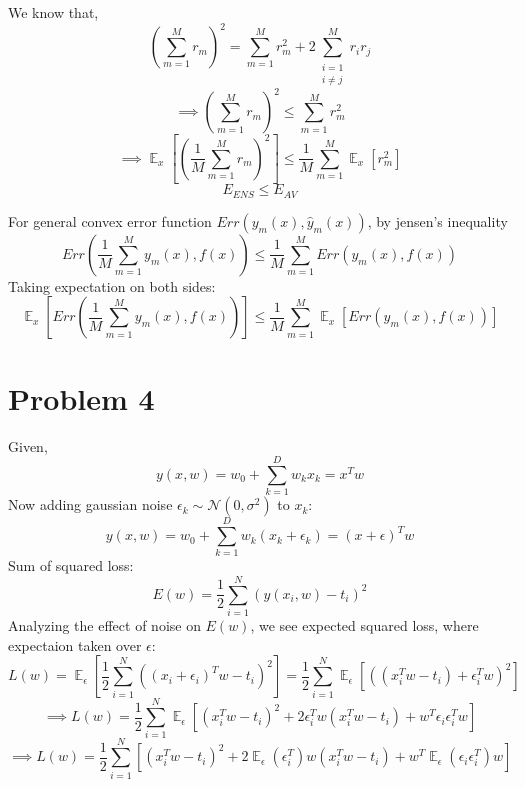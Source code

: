\documentclass[12pt]{article}
\DeclareMathOperator{\E}{\mathbb{E}}
\begin{document}
We know that, 
\begin{equation*}
    (\sum_{m=1}^{M} r_m)^2 = \sum_{m=1}^{M} r_m^2 + 2 \sum_{\substack{i=1 \\ i \neq j}}^{M} r_i r_j
\end{equation*}
\begin{equation*}
    \implies
    (\sum_{m=1}^{M} r_m)^2 \leq \sum_{m=1}^{M} r_m^2 
\end{equation*}
\begin{equation*}
    \implies
    \E_x [(\frac{1}{M} \sum_{m=1}^{M}  r_m)^2] \leq \frac{1}{M} \sum_{m=1}^{M} \E_x [ r_m^2]
\end{equation*}
\begin{equation*}
    \boxed{E_{ENS} \leq E_{AV}}
\end{equation*}

For general convex error function $Err(y_m(x), \hat{y}_m(x))$, by jensen's inequality
\begin{equation*}
    Err(\frac{1}{M} \sum_{m=1}^{M} y_m(x), f(x)) \leq \frac{1}{M} \sum_{m=1}^{M} Err(y_m(x), f(x))
\end{equation*}
Taking expectation on both sides:
\begin{equation*}
    \boxed{\E_x [Err(\frac{1}{M} \sum_{m=1}^{M} y_m(x), f(x))] \leq \frac{1}{M} \sum_{m=1}^{M} \E_x [ Err(y_m(x), f(x))]}
\end{equation*}

\section*{Problem 4}
Given, 
\begin{equation*}
    y(x, w) = w_0 + \sum_{k=1}^{D} w_k x_k = x^T w
\end{equation*}
Now adding gaussian noise $\epsilon_k \sim \mathcal{N}(0, \sigma^2)$ to $x_k$:
\begin{equation*}
    y(x, w) = w_0 + \sum_{k=1}^{D} w_k (x_k + \epsilon_k) = (x + \epsilon)^T w
\end{equation*}
Sum of squared loss:
\begin{equation*}
    E(w) = \frac{1}{2} \sum_{i=1}^{N} (y(x_i, w) - t_i)^2
\end{equation*}
Analyzing the effect of noise on $E(w)$, we see expected squared loss, where expectaion taken over $\epsilon$:
\begin{equation*}
    L(w) = \E_{\epsilon} [\frac{1}{2} \sum_{i=1}^{N} ((x_i + \epsilon_i)^T w - t_i)^2] = \frac{1}{2} \sum_{i=1}^{N} \E_{\epsilon} [((x_i^T w - t_i) + \epsilon_i^T w)^2]
\end{equation*}
\begin{equation*}
    \implies
    L(w) = \frac{1}{2} \sum_{i=1}^{N} \E_{\epsilon} [(x_i^T w - t_i)^2 + 2 \epsilon_i^T w (x_i^T w - t_i) + w^T \epsilon_i \epsilon_i^T w]
\end{equation*}
\begin{equation*}
    \implies
    L(w) = \frac{1}{2} \sum_{i=1}^{N} [(x_i^T w - t_i)^2 + 2 \E_{\epsilon} (\epsilon_i^T) w (x_i^T w - t_i) + w^T \E_{\epsilon} (\epsilon_i \epsilon_i^T) w]
\end{equation*}
\end{document}
